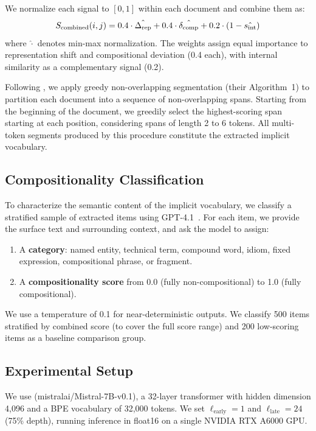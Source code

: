 We normalize each signal to $[0, 1]$ within each document and combine them as:
\begin{equation}
    S_{\mathrm{combined}}(i,j) = 0.4 \cdot \hat{\Delta_{\mathrm{rep}}} + 0.4 \cdot \hat{\delta_{\mathrm{comp}}} + 0.2 \cdot (1 - \hat{s_{\mathrm{int}}})
    \label{eq:combined}
\end{equation}
where $\hat{\cdot}$ denotes min-max normalization.
The weights assign equal importance to representation shift and compositional deviation (0.4 each), with internal similarity as a complementary signal (0.2).

Following \citet{feucht2024token}, we apply greedy non-overlapping segmentation (their Algorithm~1) to partition each document into a sequence of non-overlapping spans.
Starting from the beginning of the document, we greedily select the highest-scoring span starting at each position, considering spans of length 2 to 6 tokens.
All multi-token segments produced by this procedure constitute the extracted implicit vocabulary.

\subsection{Compositionality Classification}
\label{sec:method:classification}

To characterize the semantic content of the implicit vocabulary, we classify a stratified sample of extracted items using GPT-4.1~\cite{openai2024gpt4}.
For each item, we provide the surface text and surrounding context, and ask the model to assign:
\begin{enumerate}[leftmargin=*,itemsep=0pt,topsep=0pt]
    \item A \textbf{category}: named entity, technical term, compound word, idiom, fixed expression, compositional phrase, or fragment.
    \item A \textbf{compositionality score} from 0.0 (fully non-compositional) to 1.0 (fully compositional).
\end{enumerate}
We use a temperature of 0.1 for near-deterministic outputs.
We classify 500 items stratified by combined score (to cover the full score range) and 200 low-scoring items as a baseline comparison group.

\subsection{Experimental Setup}
\label{sec:method:setup}

We use \mistral (mistralai/Mistral-7B-v0.1), a 32-layer transformer with hidden dimension 4{,}096 and a BPE vocabulary of 32{,}000 tokens.
We set $\ell_{\mathrm{early}} = 1$ and $\ell_{\mathrm{late}} = 24$ (75\% depth), running inference in float16 on a single NVIDIA RTX A6000 GPU.

